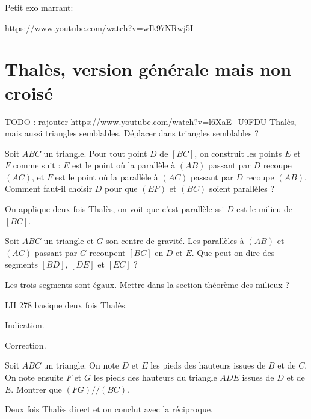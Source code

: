 Petit exo marrant:

\url{https://www.youtube.com/watch?v=wIk97NRwj5I}


\section{Thalès, version générale mais non croisé}

TODO : rajouter \url{https://www.youtube.com/watch?v=l6XaE_U9FDU} Thalès, mais aussi triangles semblables. Déplacer dans triangles semblables ?




\begin{exo}
Soit $ABC$ un triangle.
Pour tout point $D$ de $[BC]$, on construit les points $E$ et $F$ comme suit : $E$ est le point où la parallèle à $(AB)$ passant par $D$ recoupe $(AC)$, et $F$ est le point où la parallèle à $(AC)$ passant par $D$ recoupe $(AB)$.
Comment faut-il choisir $D$ pour que $(EF)$ et $(BC)$ soient parallèles ?
\begin{hint}
\end{hint}
\begin{sol}
On applique deux fois Thalès, on voit que c'est parallèle ssi $D$ est le milieu  de $[BC]$.
\end{sol}
\end{exo}



\begin{exo}
Soit $ABC$ un triangle et $G$ son centre de gravité.
Les parallèles à $(AB)$ et $(AC)$ passant par $G$ recoupent $[BC]$ en $D$ et $E$.
Que peut-on dire des segments $[BD]$, $[DE]$ et $[EC]$ ?
\begin{hint}
\end{hint}
\begin{sol}
Les trois segments sont égaux. Mettre dans la section théorème des milieux ?
\end{sol}
\end{exo}

\begin{exo}
LH 278 basique deux fois Thalès.
\begin{hint}
Indication.
\end{hint}
\begin{sol}
Correction.
\end{sol}
\end{exo}

\begin{exo}
Soit $ABC$ un triangle.
On note $D$ et $E$ les pieds des hauteurs issues de $B$ et de $C$.
On note ensuite $F$ et $G$ les pieds des hauteurs du triangle $ADE$ issues de $D$ et de $E$.
Montrer que $(FG)//(BC)$.
\begin{hint}
Deux fois Thalès direct et on conclut avec la réciproque.
\end{hint}
\begin{sol}
\end{sol}
\end{exo}


